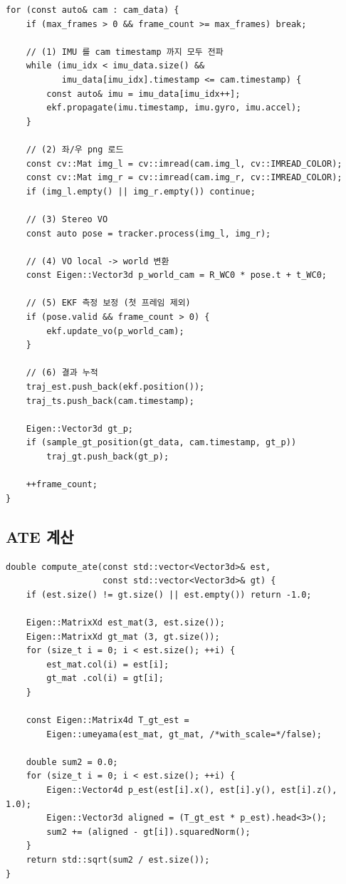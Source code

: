 \documentclass[11pt,a4paper,oneside]{report}
\begin{document}
\begin{lstlisting}[style=cpp,caption={\texttt{run\_vio.cpp:310-340}}]
for (const auto& cam : cam_data) {
    if (max_frames > 0 && frame_count >= max_frames) break;

    // (1) IMU 를 cam timestamp 까지 모두 전파
    while (imu_idx < imu_data.size() &&
           imu_data[imu_idx].timestamp <= cam.timestamp) {
        const auto& imu = imu_data[imu_idx++];
        ekf.propagate(imu.timestamp, imu.gyro, imu.accel);
    }

    // (2) 좌/우 png 로드
    const cv::Mat img_l = cv::imread(cam.img_l, cv::IMREAD_COLOR);
    const cv::Mat img_r = cv::imread(cam.img_r, cv::IMREAD_COLOR);
    if (img_l.empty() || img_r.empty()) continue;

    // (3) Stereo VO
    const auto pose = tracker.process(img_l, img_r);

    // (4) VO local -> world 변환
    const Eigen::Vector3d p_world_cam = R_WC0 * pose.t + t_WC0;

    // (5) EKF 측정 보정 (첫 프레임 제외)
    if (pose.valid && frame_count > 0) {
        ekf.update_vo(p_world_cam);
    }

    // (6) 결과 누적
    traj_est.push_back(ekf.position());
    traj_ts.push_back(cam.timestamp);

    Eigen::Vector3d gt_p;
    if (sample_gt_position(gt_data, cam.timestamp, gt_p))
        traj_gt.push_back(gt_p);

    ++frame_count;
}
\end{lstlisting}

\subsection{ATE 계산}

\begin{lstlisting}[style=cpp,caption={\texttt{run\_vio.cpp:182-200}}]
double compute_ate(const std::vector<Vector3d>& est,
                   const std::vector<Vector3d>& gt) {
    if (est.size() != gt.size() || est.empty()) return -1.0;

    Eigen::MatrixXd est_mat(3, est.size());
    Eigen::MatrixXd gt_mat (3, gt.size());
    for (size_t i = 0; i < est.size(); ++i) {
        est_mat.col(i) = est[i];
        gt_mat .col(i) = gt[i];
    }

    const Eigen::Matrix4d T_gt_est =
        Eigen::umeyama(est_mat, gt_mat, /*with_scale=*/false);

    double sum2 = 0.0;
    for (size_t i = 0; i < est.size(); ++i) {
        Eigen::Vector4d p_est(est[i].x(), est[i].y(), est[i].z(), 1.0);
        Eigen::Vector3d aligned = (T_gt_est * p_est).head<3>();
        sum2 += (aligned - gt[i]).squaredNorm();
    }
    return std::sqrt(sum2 / est.size());
}
\end{lstlisting}
\end{document}
